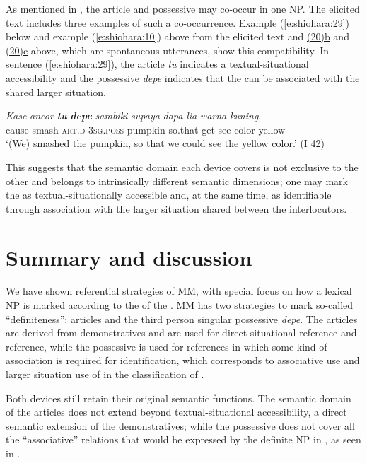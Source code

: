 \documentclass[output=paper
,modfonts
,nonflat]{langsci/langscibook}
\begin{document}
As mentioned in , the article and possessive may co-occur in one NP. The elicited text includes three examples of such a co-occurrence. Example (\ref{e:shiohara:29}) below and example (\ref{e:shiohara:10}) above from the elicited text and \hyperref[e:shiohara:20b]{(20)b} and \hyperref[e:shiohara:20c]{(20)c} above, which are spontaneous utterances, show this compatibility. In sentence (\ref{e:shiohara:29}), the article \textit{tu} indicates a textual-situational accessibility and the possessive \textit{depe} indicates that the  can be associated with the shared larger situation.

\begin{exe}
	\ex\label{e:shiohara:29}
	\gll \textit{Kase}  \textit{ancor}  \textbf{\textit{tu}} \textbf{\textit{depe}} \textit{sambiki} \textit{supaya} \textit{dapa} \textit{lia} \textit{warna} \textit{kuning}.\\
	cause  smash  \textsc{art.d}  \textsc{3sg.poss} pumpkin {so.that} get see color yellow\\
	\glt ‘(We) smashed the pumpkin, so that we could see the yellow color.’ \hfill{(I 42)}
\end{exe}

\noindent
This suggests that the semantic domain each device covers is not exclusive to the other and belongs to intrinsically different semantic dimensions; one may mark the  as textual-situationally accessible and, at the same time, as identifiable through association with the larger situation shared between the interlocutors.

\section{\label{s:shiohara:5}Summary and discussion}
We have shown referential strategies of MM, with special focus on how a lexical NP is marked according to the  of the . MM has two strategies to mark so-called “definiteness”: articles and the third person singular possessive \textit{depe}. The articles are derived from demonstratives and are used for direct situational reference and  reference, while the possessive is used for references in which some kind of association is required for identification, which corresponds to  associative use and larger situation use of  in the classification of \citet{Hawkins2015}.\largerpage

Both devices still retain their original semantic functions. The semantic domain of the articles does not extend beyond textual-situational accessibility, a direct semantic extension of the demonstratives; while the possessive does not cover all the “associative” relations that would be expressed by the definite NP in , as seen in .
\end{document}
